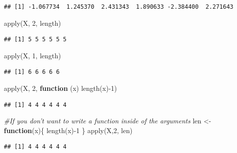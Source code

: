 \documentclass[
]{book}
\newenvironment{Shaded}{\begin{snugshade}}{\end{snugshade}}
\newcommand{\CommentTok}[1]{\textcolor[rgb]{0.56,0.35,0.01}{\textit{#1}}}
\newcommand{\ControlFlowTok}[1]{\textcolor[rgb]{0.13,0.29,0.53}{\textbf{#1}}}
\newcommand{\DecValTok}[1]{\textcolor[rgb]{0.00,0.00,0.81}{#1}}
\newcommand{\FunctionTok}[1]{\textcolor[rgb]{0.00,0.00,0.00}{#1}}
\newcommand{\NormalTok}[1]{#1}
\newcommand{\OtherTok}[1]{\textcolor[rgb]{0.56,0.35,0.01}{#1}}
\newcommand{\SpecialCharTok}[1]{\textcolor[rgb]{0.00,0.00,0.00}{#1}}
\begin{document}
\begin{verbatim}
## [1] -1.067734  1.245370  2.431343  1.890633 -2.384400  2.271643
\end{verbatim}

\begin{Shaded}
\begin{Highlighting}[]
\FunctionTok{apply}\NormalTok{(X, }\DecValTok{2}\NormalTok{, length)}
\end{Highlighting}
\end{Shaded}

\begin{verbatim}
## [1] 5 5 5 5 5 5
\end{verbatim}

\begin{Shaded}
\begin{Highlighting}[]
\FunctionTok{apply}\NormalTok{(X, }\DecValTok{1}\NormalTok{, length)}
\end{Highlighting}
\end{Shaded}

\begin{verbatim}
## [1] 6 6 6 6 6
\end{verbatim}

\begin{Shaded}
\begin{Highlighting}[]
\FunctionTok{apply}\NormalTok{(X, }\DecValTok{2}\NormalTok{, }\ControlFlowTok{function}\NormalTok{ (x) }\FunctionTok{length}\NormalTok{(x)}\SpecialCharTok{{-}}\DecValTok{1}\NormalTok{)}
\end{Highlighting}
\end{Shaded}

\begin{verbatim}
## [1] 4 4 4 4 4 4
\end{verbatim}

\begin{Shaded}
\begin{Highlighting}[]
\CommentTok{\#If you don’t want to write a function inside of the arguments}
\NormalTok{len }\OtherTok{\textless{}{-}} \ControlFlowTok{function}\NormalTok{(x)\{}
  \FunctionTok{length}\NormalTok{(x)}\SpecialCharTok{{-}}\DecValTok{1}
\NormalTok{\}}
\FunctionTok{apply}\NormalTok{(X,}\DecValTok{2}\NormalTok{, len)}
\end{Highlighting}
\end{Shaded}

\begin{verbatim}
## [1] 4 4 4 4 4 4
\end{verbatim}
\end{document}
